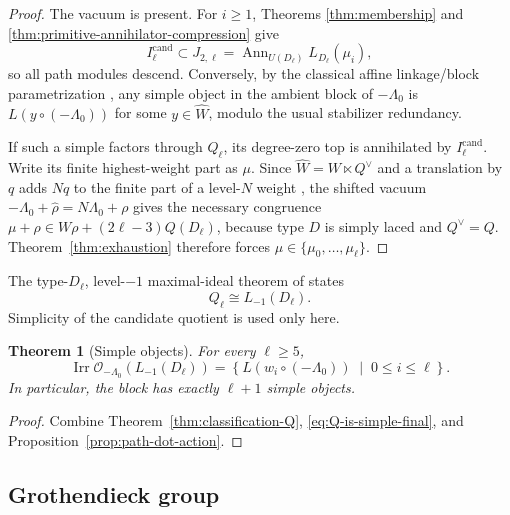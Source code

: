 \documentclass[11pt]{amsart}
\newtheorem{theorem}{Theorem}[section]
\theoremstyle{remark}
\numberwithin{equation}{section}
\begin{document}
\begin{proof}
The vacuum is present.  For \(i\ge1\), Theorems
\ref{thm:membership} and \ref{thm:primitive-annihilator-compression} give
\[
   I_\ell^{\mathrm{cand}}
   \subset J_{2,\ell}
   =\operatorname{Ann}_{U(D_\ell)}L_{D_\ell}(\mu_i),
\]
so all path modules descend.  Conversely, by the classical affine
linkage/block parametrization \cite{Kac1990}
\cite[Section~1.2]{ShanYanZhao2026}, any simple object in the ambient block of
\(-\Lambda_0\) is \(L(y\circ(-\Lambda_0))\) for some \(y\in\widehat W\),
modulo the usual stabilizer redundancy.

If such a simple factors through \(Q_\ell\), its degree-zero top is
annihilated by \(I_\ell^{\mathrm{cand}}\).  Write its finite highest-weight
part as \(\mu\).  Since \(\widehat W=W\ltimes Q^\vee\) and a
translation by \(q\) adds \(Nq\) to the finite part of a level-\(N\)
weight \cite[Chapter~6]{Kac1990}, the shifted vacuum
\(-\Lambda_0+\widehat\rho=N\Lambda_0+\rho\) gives the necessary
congruence
\(\mu+\rho\in W\rho+(2\ell-3)Q(D_\ell)\), because type \(D\) is
simply laced and \(Q^\vee=Q\).  Theorem~\ref{thm:exhaustion} therefore
forces \(\mu\in\{\mu_0,\ldots,\mu_\ell\}\).
\end{proof}

The type-\(D_\ell\), level-\(-1\) maximal-ideal theorem of
\cite{Jin2026} states
\begin{equation}
\label{eq:Q-is-simple-final}
   Q_\ell\cong L_{-1}(D_\ell).
\end{equation}
Simplicity of the candidate quotient is used only here.

\begin{theorem}[Simple objects]
\label{thm:final-simple-classification}
For every \(\ell\ge5\),
\begin{equation}
   \operatorname{Irr}\mathcal O_{-\Lambda_0}
   \!\left(L_{-1}(D_\ell)\right)
   =
   \left\{
      L\!\left(w_i\circ(-\Lambda_0)\right)
      \;\middle|\;0\le i\le\ell
   \right\}.
\end{equation}
In particular, the block has exactly \(\ell+1\) simple objects.
\end{theorem}

\begin{proof}
Combine Theorem~\ref{thm:classification-Q}, \eqref{eq:Q-is-simple-final},
and Proposition~\ref{prop:path-dot-action}.
\end{proof}

\subsection{Grothendieck group}
\end{document}
